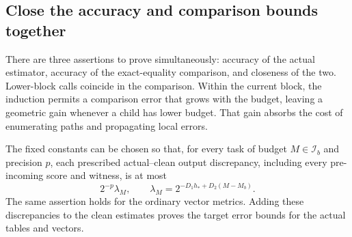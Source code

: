\subsection{Close the accuracy and comparison bounds together}

There are three assertions to prove simultaneously: accuracy of the actual estimator, accuracy of the exact-equality comparison, and closeness of the two. Lower-block calls coincide in the comparison. Within the current block, the induction permits a comparison error that grows with the budget, leaving a geometric gain whenever a child has lower budget. That gain absorbs the cost of enumerating paths and propagating local errors.

\begin{proposition}\label{prop:fp-coupling}
The fixed constants can be chosen so that, for every task of budget
$M\in\mathcal I_b$ and precision $p$, each prescribed actual--clean
output discrepancy, including every pre-incoming score and witness,
is at most
\begin{equation}
 2^{-p}\lambda_M,\qquad
 \lambda_M=2^{-D_1h_*+D_2(M-M_b)}.
 \label{eq:fp-lambda}
\end{equation}
The same assertion holds for the ordinary vector metrics.  Adding
these discrepancies to the clean estimates proves the target error
bounds for the actual tables and vectors.
\end{proposition}

